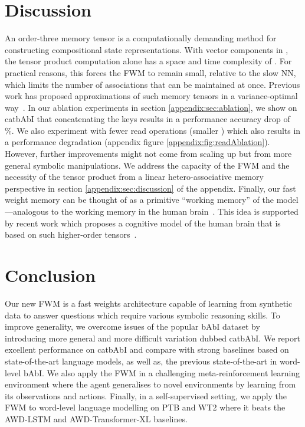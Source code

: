 \documentclass{article} \usepackage{iclr2021_conference,times}
\begin{document}
\section{Discussion}
An order-three memory tensor is a computationally demanding method for constructing compositional state representations. 
With vector components in , the tensor product computation alone has a space and time complexity of . 
For practical reasons, this forces the FWM to remain small, relative to the slow NN, which limits the number of associations that can be maintained at once. 
Previous work has proposed approximations of such memory tensors in a variance-optimal way~\citep{schlag2019enhancing}. 
In our ablation experiments in section \ref{appendix:sec:ablation}, we show on catbAbI that concatenating the keys results in a performance accuracy drop of \%.
We also experiment with fewer read operations (smaller ) which also results in a performance degradation (appendix figure \ref{appendix:fig:readAblation}).
However, further improvements might not come from scaling up but from more general symbolic manipulations. 
We address the capacity of the FWM and the necessity of the tensor product from a linear hetero-associative memory perspective in section \ref{appendix:sec:discussion} of the appendix.
Finally, our fast weight memory can be thought of as a primitive ``working memory'' of the model---analogous to the working memory in the human brain~\citep{spalding2018ventromedial}.
This idea is supported by recent work which proposes a cognitive model of the human brain that is based on such higher-order tensors~\citep{Tresp2017TheTM}. 

\section{Conclusion}
Our new FWM is a fast weights architecture capable of learning from synthetic data to answer questions which require various symbolic reasoning skills. 
To improve generality, we overcome issues of the popular bAbI dataset by introducing more general and more difficult variation dubbed catbAbI. 
We report excellent performance on catbAbI and compare with strong baselines based on state-of-the-art language models, as well as, the previous state-of-the-art in word-level bAbI. 
We also apply the FWM in a challenging meta-reinforcement learning environment where the agent generalises to novel environments by learning from its observations and actions. 
Finally, in a self-supervised setting, we apply the FWM to word-level language modelling on PTB and WT2 where it beats the AWD-LSTM and AWD-Transformer-XL baselines.
\end{document}
